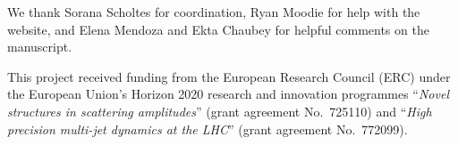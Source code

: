 %
%


We thank Sorana Scholtes for coordination, Ryan Moodie for help with the website, and Elena Mendoza and Ekta Chaubey for 
helpful comments on the manuscript.

This project received funding from the European Research Council (ERC) under the European Union's Horizon 2020 research and innovation programmes ``{\it Novel structures in scattering amplitudes}'' (grant agreement No.~725110) and ``{\it High precision multi-jet dynamics at the LHC}'' (grant agreement No.~772099).
